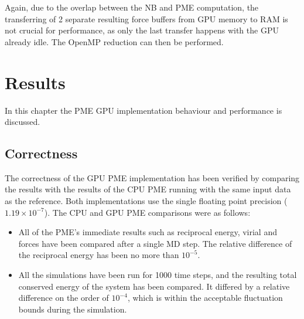 \documentclass[12pt,a4paper,notitlepage]{report}
\newcommand{\draft}[1]{#1}
\begin{document}
Again, due to the overlap between the NB and PME computation, the transferring of 2 separate resulting force buffers from GPU memory to RAM is not crucial for performance, as only the last transfer happens with the GPU already idle. The OpenMP reduction can then be performed.

\newpage
\chapter{Results}

In this chapter the PME GPU implementation behaviour and performance is discussed.

\section{Correctness}
The correctness of the GPU PME implementation has been verified by comparing the results with the results of the CPU PME running with the same input data as the reference. Both implementations use the single floating point precision ($1.19\times10^{-7}$).
The CPU and GPU PME comparisons were as follows:
\begin{itemize}
\item All of the PME's immediate results such as reciprocal energy, virial and forces have been compared after a single MD step. The relative difference of the reciprocal energy has been no more than $10^{-5}$.


\item All the simulations have been run for 1000 time steps, and the resulting total conserved energy of the system has been compared. It differed by a relative difference on the order of $10^{-4}$, which is within the acceptable fluctuation bounds during the simulation.
\end{itemize} 
\end{document}
